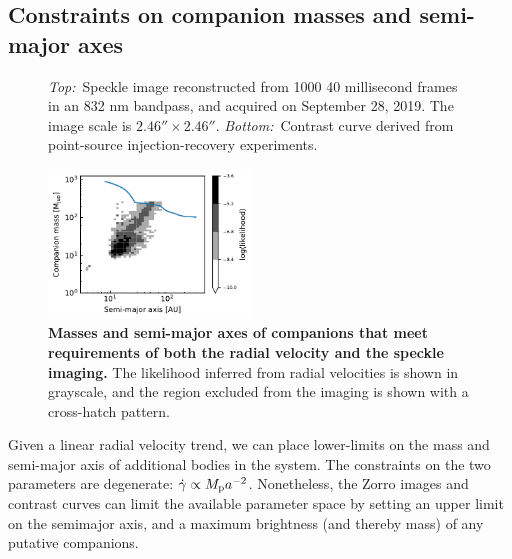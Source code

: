 \documentclass[12pt,twocolumn,tighten]{aastex62}
\begin{document}
\subsection{Constraints on companion masses and semi-major axes}

\begin{figure}[!t]
	\vspace{-1cm}
	\vspace{-0.7cm}
    \caption{
      {\it Top:\,} 
      Speckle image reconstructed from 1000 40 millisecond frames in an 832 nm bandpass, and acquired on September 28, 2019.
      The image scale is $2.46''\times2.46''$.
      {\it Bottom:\,} 
      Contrast curve derived from point-source injection-recovery
      experiments.
    }
    \label{fig:zorro}
\end{figure}

\begin{figure}[t]
	\begin{center}
		\leavevmode
		\includegraphics[width=0.48\textwidth]{f4.pdf}
	\end{center}
	\vspace{-0.7cm}
	\caption{
    {\bf Masses and semi-major axes of companions that meet
    requirements of both the radial velocity and the speckle imaging.}
    The likelihood inferred from radial velocities is shown in
    grayscale, and the region excluded from the imaging is shown with
    a cross-hatch pattern.
	\label{fig:mass_sma}
  \vspace{-0.3cm}
	}
\end{figure}


Given a linear radial velocity trend, we can place lower-limits on the
mass and semi-major axis of additional bodies in the system.  The
constraints on the two parameters are degenerate: $\dot{\gamma}
\propto M_{\rm p} a^{-2}$.  Nonetheless, the Zorro images and contrast
curves can limit the available parameter space by setting an upper
limit on the semimajor axis, and a maximum brightness (and thereby
mass) of any putative companions.
\end{document}

